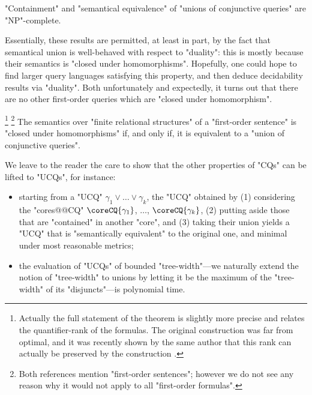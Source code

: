 \begin{corollary}
	"Containment" and "semantical equivalence" of "unions of conjunctive queries"
	are "NP"-complete.
\end{corollary}

Essentially, these results are permitted, at least in part, by the fact that semantical union
is well-behaved with respect to "duality": this is mostly because their semantics 
is "closed under homomorphisms". Hopefully, one could hope to find larger
query languages satisfying this property, and then deduce decidability results via "duality".
Both unfortunately and expectedly, it turns out that there
are no other first-order queries which are "closed under homomorphism".\AP
\begin{proposition}
	\!\footnote{Actually the full statement of the theorem is
	slightly more precise and relates the quantifier-rank of the formulas.
	The original construction was far from optimal, and it was
	recently shown by the same author
	that this rank can actually be preserved by the construction
	\cite[Theorem~1.4]{Rossman2025Equirank}.}%
	\footnote{Both references mention "first-order sentences"; however we do not see
	any reason why it would not apply to all "first-order formulas".}
	The semantics over "finite relational structures"
	of a "first-order sentence" is "closed under homomorphisms"
	if, and only if, it is equivalent to a "union of conjunctive queries".
\end{proposition}

We leave to the reader the care to show that the other properties of "CQs"
can be lifted to "UCQs", for instance:
\begin{itemize}
	\item starting from a "UCQ" $\gamma_1 \lor \dotsc \lor \gamma_k$,
		the "UCQ" obtained by (1) considering the "cores@@CQ"
		$\coreCQ{\gamma_1}$, $\dotsc$, $\coreCQ{\gamma_k}$,
		(2) putting aside those that are "contained" in another "core",
		and (3) taking their union
		yields a "UCQ" that is "semantically equivalent" to the
		original one, and minimal under most reasonable metrics;
	\item the evaluation of "UCQs" of bounded "tree-width"---we naturally
		extend the notion of "tree-width" to unions by letting it
		be the maximum of the "tree-width" of its "disjuncts"---is
		polynomial time. 
\end{itemize}